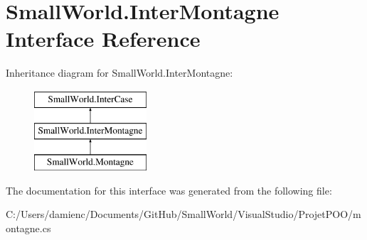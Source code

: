 \hypertarget{interface_small_world_1_1_inter_montagne}{\section{Small\-World.\-Inter\-Montagne Interface Reference}
\label{interface_small_world_1_1_inter_montagne}
}
Inheritance diagram for Small\-World.\-Inter\-Montagne\-:\begin{figure}[H]
\begin{center}
\leavevmode
\includegraphics[height=3.000000cm]{interface_small_world_1_1_inter_montagne}
\end{center}
\end{figure}


The documentation for this interface was generated from the following file\-:\begin{DoxyCompactItemize}
\item 
C\-:/\-Users/damienc/\-Documents/\-Git\-Hub/\-Small\-World/\-Visual\-Studio/\-Projet\-P\-O\-O/montagne.\-cs\end{DoxyCompactItemize}
